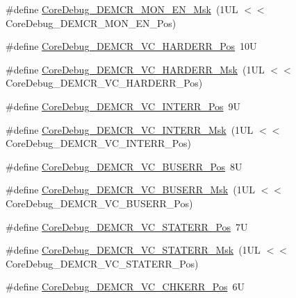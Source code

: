 \begin{DoxyCompactItemize}
\item 
\#define \hyperlink{group___c_m_s_i_s___core_debug_gac2b46b9b65bf8d23027f255fc9641977}{Core\+Debug\+\_\+\+D\+E\+M\+C\+R\+\_\+\+M\+O\+N\+\_\+\+E\+N\+\_\+\+Msk}~(1\+U\+L $<$$<$ Core\+Debug\+\_\+\+D\+E\+M\+C\+R\+\_\+\+M\+O\+N\+\_\+\+E\+N\+\_\+\+Pos)
\item 
\#define \hyperlink{group___c_m_s_i_s___core_debug_gaed9f42053031a9a30cd8054623304c0a}{Core\+Debug\+\_\+\+D\+E\+M\+C\+R\+\_\+\+V\+C\+\_\+\+H\+A\+R\+D\+E\+R\+R\+\_\+\+Pos}~10U
\item 
\#define \hyperlink{group___c_m_s_i_s___core_debug_ga803fc98c5bb85f10f0347b23794847d1}{Core\+Debug\+\_\+\+D\+E\+M\+C\+R\+\_\+\+V\+C\+\_\+\+H\+A\+R\+D\+E\+R\+R\+\_\+\+Msk}~(1\+U\+L $<$$<$ Core\+Debug\+\_\+\+D\+E\+M\+C\+R\+\_\+\+V\+C\+\_\+\+H\+A\+R\+D\+E\+R\+R\+\_\+\+Pos)
\item 
\#define \hyperlink{group___c_m_s_i_s___core_debug_ga22079a6e436f23b90308be97e19cf07e}{Core\+Debug\+\_\+\+D\+E\+M\+C\+R\+\_\+\+V\+C\+\_\+\+I\+N\+T\+E\+R\+R\+\_\+\+Pos}~9U
\item 
\#define \hyperlink{group___c_m_s_i_s___core_debug_gad6815d8e3df302d2f0ff2c2c734ed29a}{Core\+Debug\+\_\+\+D\+E\+M\+C\+R\+\_\+\+V\+C\+\_\+\+I\+N\+T\+E\+R\+R\+\_\+\+Msk}~(1\+U\+L $<$$<$ Core\+Debug\+\_\+\+D\+E\+M\+C\+R\+\_\+\+V\+C\+\_\+\+I\+N\+T\+E\+R\+R\+\_\+\+Pos)
\item 
\#define \hyperlink{group___c_m_s_i_s___core_debug_gab8e3d8f0f9590a51bbf10f6da3ad6933}{Core\+Debug\+\_\+\+D\+E\+M\+C\+R\+\_\+\+V\+C\+\_\+\+B\+U\+S\+E\+R\+R\+\_\+\+Pos}~8U
\item 
\#define \hyperlink{group___c_m_s_i_s___core_debug_ga9d29546aefe3ca8662a7fe48dd4a5b2b}{Core\+Debug\+\_\+\+D\+E\+M\+C\+R\+\_\+\+V\+C\+\_\+\+B\+U\+S\+E\+R\+R\+\_\+\+Msk}~(1\+U\+L $<$$<$ Core\+Debug\+\_\+\+D\+E\+M\+C\+R\+\_\+\+V\+C\+\_\+\+B\+U\+S\+E\+R\+R\+\_\+\+Pos)
\item 
\#define \hyperlink{group___c_m_s_i_s___core_debug_ga16f0d3d2ce1e1e8cd762d938ac56c4ac}{Core\+Debug\+\_\+\+D\+E\+M\+C\+R\+\_\+\+V\+C\+\_\+\+S\+T\+A\+T\+E\+R\+R\+\_\+\+Pos}~7U
\item 
\#define \hyperlink{group___c_m_s_i_s___core_debug_gaa38b947d77672c48bba1280c0a642e19}{Core\+Debug\+\_\+\+D\+E\+M\+C\+R\+\_\+\+V\+C\+\_\+\+S\+T\+A\+T\+E\+R\+R\+\_\+\+Msk}~(1\+U\+L $<$$<$ Core\+Debug\+\_\+\+D\+E\+M\+C\+R\+\_\+\+V\+C\+\_\+\+S\+T\+A\+T\+E\+R\+R\+\_\+\+Pos)
\item 
\#define \hyperlink{group___c_m_s_i_s___core_debug_ga10fc7c53bca904c128bc8e1a03072d50}{Core\+Debug\+\_\+\+D\+E\+M\+C\+R\+\_\+\+V\+C\+\_\+\+C\+H\+K\+E\+R\+R\+\_\+\+Pos}~6U
$$
\end{DoxyCompactItemize}
